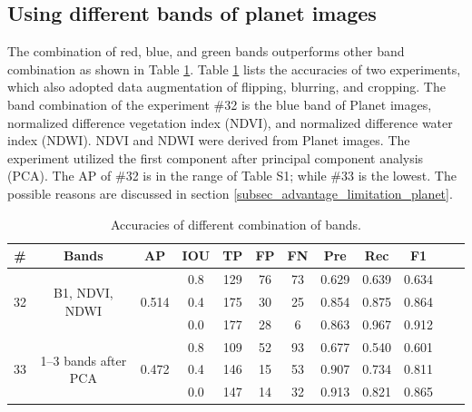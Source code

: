 \documentclass[preprint,12pt,authoryear]{elsarticle}
\begin{document}
\subsection{Using different bands of planet images}
\label{subsub_otherbands}

The combination of red, blue, and green bands outperforms other band combination as shown in Table \ref{table_acc_otherbands}. Table \ref{table_acc_otherbands} lists the accuracies of two experiments, which also adopted data augmentation of flipping, blurring, and cropping. The band combination of the experiment \#32 is the blue band of Planet images, normalized difference vegetation index (NDVI), and normalized difference water index (NDWI).  NDVI and NDWI were derived from Planet images. The experiment utilized the first component after principal component analysis (PCA). The AP of \#32 is in the range of Table S1; while \#33 is the lowest. The possible reasons are discussed in section \ref{subsec_advantage_limitation_planet}.  %

\begin{table}[ht]
\footnotesize
\caption{Accuracies of different combination of bands.}
\label{table_acc_otherbands}
\begin{tabular}{c c c c  c ccc c c c c}
\toprule
\textbf{\#}&\textbf{Bands}&\textbf{AP}&\textbf{IOU}&\textbf{TP}&\textbf{FP}&\textbf{FN}&\textbf{Pre}&\textbf{Rec}&\textbf{F1}\\
\midrule

\multirow{3}{*}{32} &  \multirow{3}{*}{B1, NDVI, NDWI} & \multirow{3}{*}{0.514}  &0.8&129&76&73&0.629 &0.639 &0.634   \\
 &  &  &0.4&175&30&25&0.854 &0.875 &0.864  \\
 &  &  &0.0&177&28&6&0.863 &0.967 &0.912   \\

\multirow{3}{*}{33} &  \multirow{3}{*}{1--3 bands after PCA} & \multirow{3}{*}{0.472} &0.8&109&52&93&0.677 &0.540 &0.601  \\
 &  &  &0.4&146&15&53&0.907 &0.734 &0.811  \\
 &  & &0.0&147&14&32&0.913 &0.821 &0.865  \\

\bottomrule
\end{tabular}
\end{table}
\end{document}
